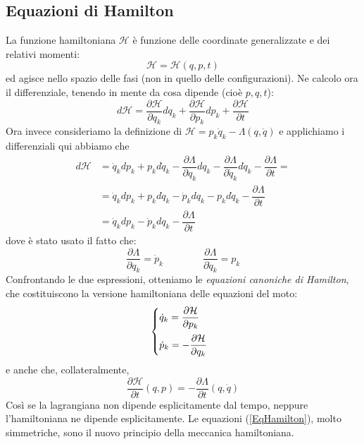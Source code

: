 \documentclass[a4paper,openany]{article}
\begin{document}
	\subsection{Equazioni di Hamilton}
	La funzione hamiltoniana $\mathcal{H}$ è funzione delle coordinate generalizzate e dei relativi momenti:
	$$
	\mathcal{H} = \mathcal{H}(q,p,t)
	$$
	ed agisce nello spazio delle fasi (non in quello delle configurazioni). 
	Ne calcolo ora il differenziale, tenendo in mente da cosa dipende (cioè $p,q,t$):
	\begin{equation}\label{key}
		d\mathcal{H} = \dfrac{\partial \mathcal{H}}{\partial q_k}dq_k +\dfrac{\partial \mathcal{H}}{\partial p_k}dp_k + \dfrac{\partial \mathcal{H}}{\partial t}
	\end{equation}
	Ora invece consideriamo la definizione di $\mathcal{H} = p_k\dot{q}_k  -\Lambda(q,\dot{q})$ e applichiamo i differenziali qui abbiamo che
	\begin{equation}
		\begin{aligned}
			d\mathcal{H} &= \dot{q}_k dp_k + p_k d\dot{q}_k -\dfrac{\partial \Lambda}{\partial q_k}dq_k -\dfrac{\partial \Lambda}{\partial \dot{q}_k}d\dot{q}_k - \dfrac{\partial \Lambda}{\partial t} =\\
			&= \dot{q}_k dp_k + p_k d\dot{q}_k - \dot{p}_k dq_k - p_k d\dot{q}_k - \dfrac{\partial \Lambda}{\partial t} \\
			&= \dot{q}_k dp_k -  \dot{p}_k dq_k - \dfrac{\partial \Lambda}{\partial t} 
		\end{aligned}
	\end{equation}
dove è stato usato il fatto che:
$$
\dfrac{\partial \Lambda}{\partial q_k} = \dot{p}_k   \quad \quad \quad \quad \dfrac{\partial \Lambda}{\partial \dot{q}_k} = p_k
$$
	Confrontando le due espressioni, otteniamo le \textit{equazioni canoniche di Hamilton}, che costituiscono la versione hamiltoniana delle equazioni del moto:
	\begin{equation}\
		\begin{cases}
			\dot{q}_k = \dfrac{\partial \mathcal{H}}{\partial p_k}\vspace{2mm}   \\
			
			\dot{p}_k = -\dfrac{\partial \mathcal{H}}{\partial q_k}
		\end{cases}
	\label{EqHamilton}
	\end{equation}
	e anche che, collateralmente,
	\begin{equation}\label{key}
		\dfrac{\partial \mathcal{H}}{\partial t}(q,p) = - \dfrac{\partial \Lambda}{\partial t}(q,\dot{q})
	\end{equation}
	Così se la lagrangiana non dipende esplicitamente dal tempo, neppure l'hamiltoniana ne dipende esplicitamente. Le equazioni (\ref{EqHamilton}), molto simmetriche, sono il nuovo principio della meccanica hamiltoniana.
\end{document}
